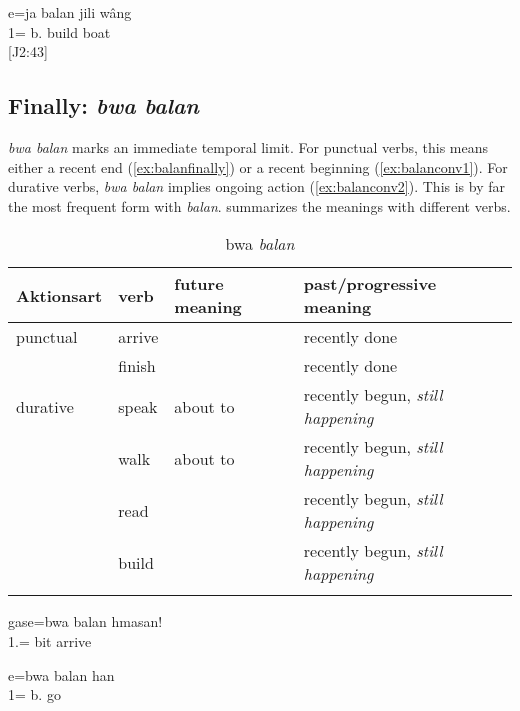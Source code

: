 \ea\label{ex:jab3} 
\gll 	e=ja balan jili wâng	\\
	1= b. build boat	\\
\glt {} {[J2:43]}%
\z

\subsection{Finally: \textit{bwa balan}}
\label{sec:bwa_balan}
\textit{bwa balan} marks an immediate temporal limit. For punctual verbs, this means either a recent end (\ref{ex:balanfinally}) or a recent beginning (\ref{ex:balanconv1}). For durative verbs, \textit{bwa balan} implies ongoing action (\ref{ex:balanconv2}). This is by far the most frequent form with \textit{balan}.  summarizes the meanings with different verbs. 

\begin{table}
	\caption{bwa \textit{balan}}
	\begin{tabular}{llll}
	\lsptoprule
		Aktionsart& verb & future meaning & past\slash progressive meaning \\\midrule
		punctual&arrive & &recently done\\
		&finish & & recently done\\
		durative	&speak & about to& recently begun, \textit{still happening}  \\
		 &walk & about to  &recently begun, \textit{still happening}\\
		&read & & recently begun, \textit{still happening}\\
		&build	&	&  recently begun, \textit{still happening}\\
	\lspbottomrule
	\end{tabular}
\label{tab:bwabalan}
\end{table}


\ea\label{ex:balanfinally}
\gll gase={bwa} balan hmasan!\\
 1.= bit arrive\\
\glt {}%
\z

\ea\label{ex:balanconv1}
\gll e=bwa balan han\\
 1= b. go\\
\glt {}
\z

